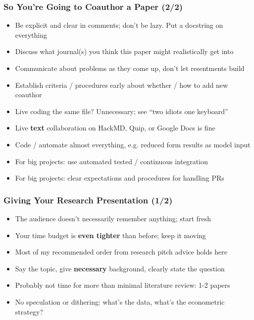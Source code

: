 \documentclass[aspectratio=169]{beamer}
\begin{document}
\begin{frame}
\frametitle{So You're Going to Coauthor a Paper (2/2)}
\begin{itemize}
	\item Be explicit and clear in comments; don't be lazy. Put a docstring on everything
	
	\item <2->Discuss what journal(s) you think this paper might realistically get into
	
	\item <2->Communicate about problems as they come up, don't let resentments build
	
	\item <3->Establish criteria / procedures early about whether / how to add new coauthor
	
	\item <4->Live coding the same file? Unnecessary; see ``two idiots one keyboard''
	
	\item <4->Live \textbf{text} collaboration on HackMD, Quip, or Google Docs is fine
	
	\item <5->Code / automate almost everything, e.g. reduced form results as model input
	
	\item <6->For big projects: use automated tested / continuous integration
	
	\item <6->For big projects: clear expectations and procedures for handling PRs
\end{itemize}
\end{frame}


\begin{frame}
\frametitle{Giving Your Research Presentation (1/2)}
\begin{itemize}
	\item The audience doesn't necessarily remember anything; start fresh
	
	\item Your time budget is \textbf{even tighter} than before; keep it moving
	
	\item <2->Most of my recommended order from research pitch advice holds here
	
	\item <2->Say the topic, give \textbf{necessary} background, clearly state the question
	
	\item <3->Probably not time for more than minimal literature review: 1-2 papers
	
	\item <3->No speculation or dithering: what's the data, what's the econometric strategy?
\end{itemize}
\end{frame}
\end{document}
